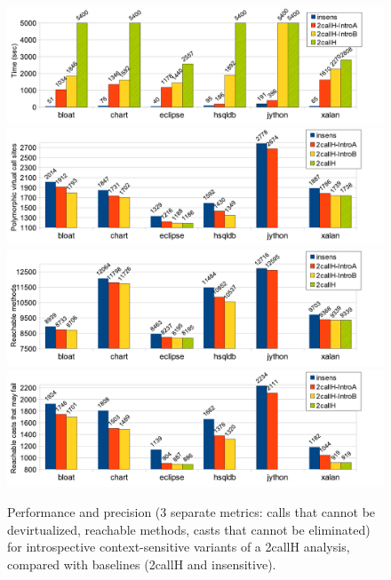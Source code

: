 \begin{figure}[tbp]
\begin{center}
\includegraphics[scale=0.54]{assets/introspective/2callHtime.pdf} \\
\includegraphics[scale=0.54]{assets/introspective/2callHvcalls.pdf} \\
\includegraphics[scale=0.54]{assets/introspective/2callHmeths.pdf} \\
\includegraphics[scale=0.54]{assets/introspective/2callHcasts.pdf}
\vspace{-0.65cm}
\end{center}
\caption{Performance and precision (3 separate metrics: calls that
  cannot be devirtualized, reachable methods, casts that cannot be
  eliminated) for introspective context-sensitive
 variants of a 2callH analysis, compared with baselines (2callH and insensitive).}
\label{2callH-chart}
\end{figure}

